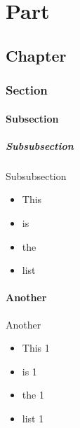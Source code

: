 \part{Part}

\chapter{Chapter}

\section{Section}

\subsection{Subsection}

\subsubsection{Subsubsection}


\begin{frame}[fragile]{Subsubsection}

\begin{itemize}
\item\relax 
This



\item\relax 
is



\item\relax 
the



\item\relax 
list




\end{itemize}
\end{frame}

\subsection{Another}


\begin{frame}[fragile]{Another}

\begin{itemize}
\item\relax 
This 1



\item\relax 
is 1



\item\relax 
the 1



\item\relax 
list 1




\end{itemize}
\end{frame}

